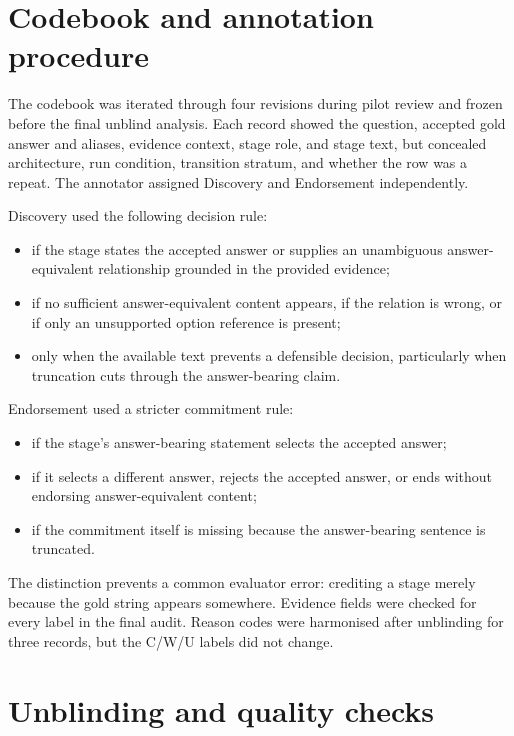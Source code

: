 \section{Codebook and annotation procedure}

The codebook was iterated through four revisions during pilot review and frozen before the final unblind analysis. Each record showed the question, accepted gold answer and aliases, evidence context, stage role, and stage text, but concealed architecture, run condition, transition stratum, and whether the row was a repeat. The annotator assigned Discovery and Endorsement independently.

Discovery used the following decision rule:

\begin{itemize}[leftmargin=*]
  \item \correct{} if the stage states the accepted answer or supplies an unambiguous answer-equivalent relationship grounded in the provided evidence;
  \item \wrong{} if no sufficient answer-equivalent content appears, if the relation is wrong, or if only an unsupported option reference is present;
  \item \uncertain{} only when the available text prevents a defensible decision, particularly when truncation cuts through the answer-bearing claim.
\end{itemize}

Endorsement used a stricter commitment rule:

\begin{itemize}[leftmargin=*]
  \item \correct{} if the stage's answer-bearing statement selects the accepted answer;
  \item \wrong{} if it selects a different answer, rejects the accepted answer, or ends without endorsing answer-equivalent content;
  \item \uncertain{} if the commitment itself is missing because the answer-bearing sentence is truncated.
\end{itemize}

The distinction prevents a common evaluator error: crediting a stage merely because the gold string appears somewhere. Evidence fields were checked for every \correct{} label in the final audit. Reason codes were harmonised after unblinding for three records, but the C/W/U labels did not change.

\section{Unblinding and quality checks}

